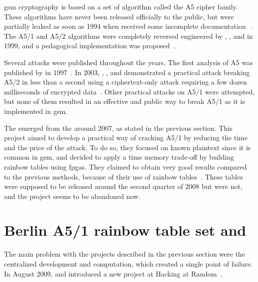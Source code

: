 {{      \gls{gsm} cryptography is based on a set of algorithm called the
      A5 cipher family. These algorithms have never been released
      officially to the public, but were partially leaked as soon as
      1994 when  received some incomplete
      documentation ~\cite{anderson_a5_1994}. The A5/1 and A5/2 algorithms
      were completely reversed engineered by ,
      , and  in 1999, and a
      pedagogical implementation was
      proposed~\cite{briceno_pedagogical_1999}.

      Several attacks were published throughout the years. The first
      analysis of A5 was published by  in
      1997~\cite{golic_cryptanalysis_1997}. In 2003, ,
      , and  demonstrated a
      practical attack breaking A5/2 in less than a second using a
      ciphertext-only attack requiring a few dozen milliseconds of
      encrypted data~\cite{barkan_instant_2003}. Other practical attacks
      on A5/1 were attempted, but none of them resulted in an effective
      and public way to break A5/1 as it is implemented in \gls{gsm}.

      The  emerged from \gls{thc} around 2007,
      as stated in the previous section. This project aimed to develop a
      practical way of cracking A5/1 by reducing the time and the price
      of the attack. To do so, they focused on known plaintext since it
      is common in \gls{gsm}, and decided to apply a time memory
      trade-off by building rainbow tables using \glspl{fpga}. They
      claimed to obtain very good results compared to the previous
      methods, because of their use of rainbow
      tables~\cite{hulton_intercepting_2008}. These tables were supposed
      to be released around the second quarter of 2008 but were not, and
      the project seems to be abandoned now.

    \section{Berlin A5/1 rainbow table set and }
    \label{sec:berlin}

      The main problem with the projects described in the previous
      section were the centralized development and computation, which
      created a single point of failure. In August 2009,  and  introduced a new project at
      Hacking at Random~\cite{nohl_subverting_2009}.
      
}}
